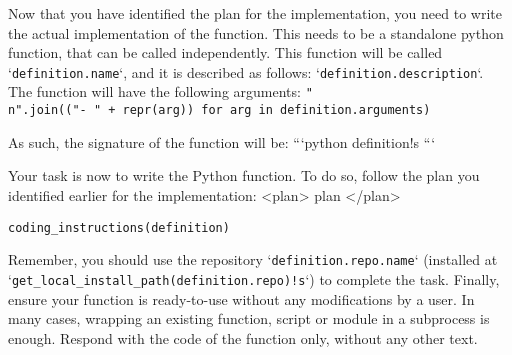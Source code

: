 



\begin{tcolorbox}[title={\texttt{Implement Function User Instructions}}]
Now that you have identified the plan for the implementation, you need to write the actual implementation of the function.
This needs to be a standalone python function, that can be called independently. 
This function will be called `\texttt{{definition.name}}`, and it is described as follows: `\texttt{{definition.description}}`.
The function will have the following arguments:
\texttt{{"\\n".join(("- " + repr(arg)) for arg in definition.arguments)}}

As such, the signature of the function will be:
```python
{definition!s}
```

Your task is now to write the Python function.
To do so, follow the plan you identified earlier for the implementation:
<plan>
{plan}
</plan>

\texttt{{coding\_instructions(definition)}}

Remember, you should use the repository `\texttt{{definition.repo.name}}` (installed at `\texttt{{get\_local\_install\_path(definition.repo)!s}}`) to complete the task.
Finally, ensure your function is ready-to-use without any modifications by a user. In many cases, wrapping an existing function, script or module in a subprocess is enough.
Respond with the code of the function only, without any other text.
\end{tcolorbox}


